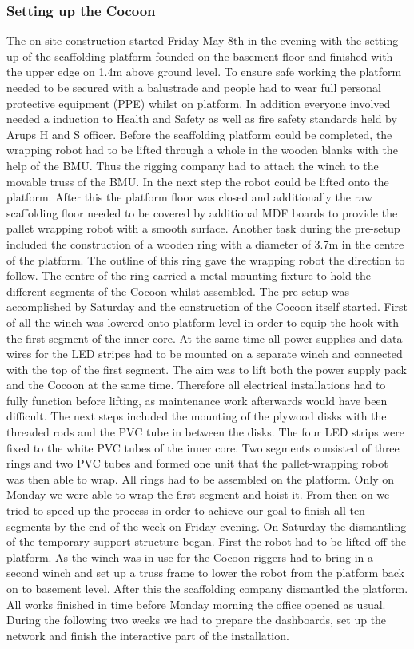 \subsubsection*{Setting up the Cocoon}

The on site construction started Friday May 8th in the evening with the setting up of the scaffolding platform founded on the basement floor and finished with the upper edge on 1.4m above ground level. To ensure safe working the platform needed to be secured with a balustrade and people had to wear full personal protective equipment (PPE) whilst on platform. In addition everyone involved needed a induction to Health and Safety as well as fire safety standards held by Arups H and S officer.
Before the scaffolding platform could be completed, the wrapping robot had to be lifted through a whole in the wooden blanks with the help of the BMU. Thus the rigging company had to attach the winch to the movable truss of the BMU. In the next step the robot could be lifted onto the platform. After this the platform floor was closed and additionally the raw scaffolding floor needed to be covered by additional MDF boards to provide the pallet wrapping robot with a smooth surface. 
Another task during the pre-setup included the construction of a wooden ring with a diameter of 3.7m in the centre of the platform. The outline of this ring gave the wrapping robot the direction to follow. The centre of the ring carried a metal mounting fixture to hold the different segments of the Cocoon whilst assembled.
The pre-setup was accomplished by Saturday and the construction of the Cocoon itself started. First of all the winch was lowered onto platform level in order to equip the hook with the first segment of the inner core. At the same time all power supplies and data wires for the LED stripes had to be mounted on a separate winch and connected with the top of the first segment. The aim was to lift both the power supply pack and the Cocoon at the same time. Therefore all electrical installations had to fully function before lifting, as maintenance work afterwards would have been difficult. The next steps included the mounting of the plywood disks with the threaded rods and the PVC tube in between the disks. The four LED strips were fixed to the white PVC tubes of the inner core. 
Two segments consisted of three rings and two PVC tubes and formed one unit that the pallet-wrapping robot was then able to wrap. All rings had to be assembled on the platform.
Only on Monday we were able to wrap the first segment and hoist it. From then on we tried to speed up the process in order to achieve our goal to finish all ten segments by the end of the week on Friday evening.
On Saturday the dismantling of the temporary support structure began. First the robot had to be lifted off the platform. As the winch was in use for the Cocoon riggers had to bring in a second winch and set up a truss frame to lower the robot from the platform back on to basement level. After this the scaffolding company dismantled the platform. 
All works finished in time before Monday morning the office opened as usual. During the following two weeks we had to prepare the dashboards, set up the network and finish the interactive part of the installation.

